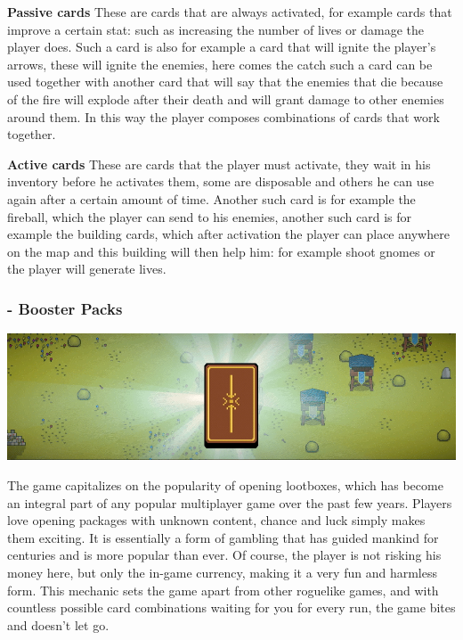\documentclass[a4paper,10pt,english]{article}
\begin{document}
\textbf{Passive cards}\newline
These are cards that are always activated, for example cards that improve a certain stat: such as increasing the number of lives or damage the player does. Such a card is also for example a card that will ignite the player's arrows, these will ignite the enemies, here comes the catch such a card can be used together with another card that will say that the enemies that die because of the fire will explode after their death and will grant damage to other enemies around them. In this way the player composes combinations of cards that work together.

\textbf{Active cards}\newline
These are cards that the player must activate, they wait in his inventory before he activates them, some are disposable and others he can use again after a certain amount of time. Another such card is for example the fireball, which the player can send to his enemies, another such card is for example the building cards, which after activation the player can place anywhere on the map and this building will then help him: for example shoot gnomes or the player will generate lives.


\subsubsection*{ - Booster Packs}
\begin{center}
    \includegraphics[width=1\textwidth]{boosterPack.jpg}
\end{center}

The game capitalizes on the popularity of opening lootboxes, which has become an integral part of any popular multiplayer game over the past few years. Players love opening packages with unknown content, chance and luck simply makes them exciting. It is essentially a form of gambling that has guided mankind for centuries and is more popular than ever. Of course, the player is not risking his money here, but only the in-game currency, making it a very fun and harmless form. This mechanic sets the game apart from other roguelike games, and with countless possible card combinations waiting for you for every run, the game bites and doesn't let go.
\end{document}
